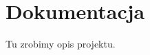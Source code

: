 \documentclass[12pt]{article}
\begin{document}
	\maketitle
	
	\section{Dokumentacja}
	Tu zrobimy opis projektu.
	
\end{document}
